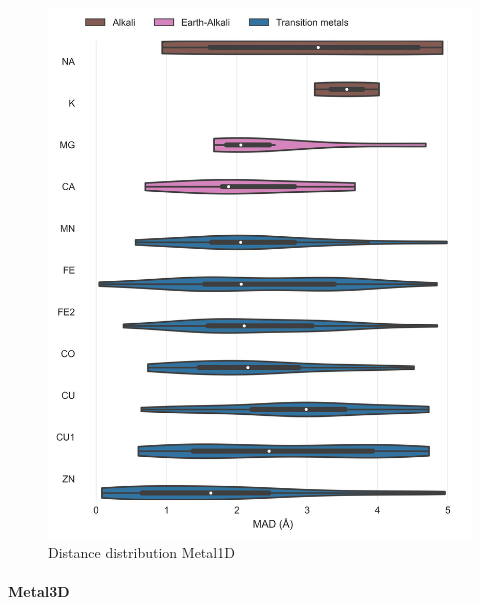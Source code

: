 \documentclass[  ASAPversion,
  ,
  9pt]{elife}
\newenvironment{fignos:tagged-figure}[1][]{
  \let\oldthefigure\thefigure
  \let\oldtheHfigure\theHfigure
  \renewcommand{\thefigure}{#1}
  \renewcommand{\theHfigure}{#1}
}{
  \let\thefigure\oldthefigure
  \let\theHfigure\oldtheHfigure
  \addtocounter{figure}{-1}
}
\begin{document}
\begin{fignos:tagged-figure}[S4]

\begin{figure}
\hypertarget{fig:selectivity-distance-metal1d}{%
\centering
\includegraphics{images/model_0.5metal1D_distances_violin.jpg}
\caption{Distance distribution Metal1D}\label{fig:selectivity-distance-metal1d}
}
\end{figure}

\end{fignos:tagged-figure}

\hypertarget{metal3d-1}{%
\paragraph{Metal3D}\label{metal3d-1}}
\end{document}
